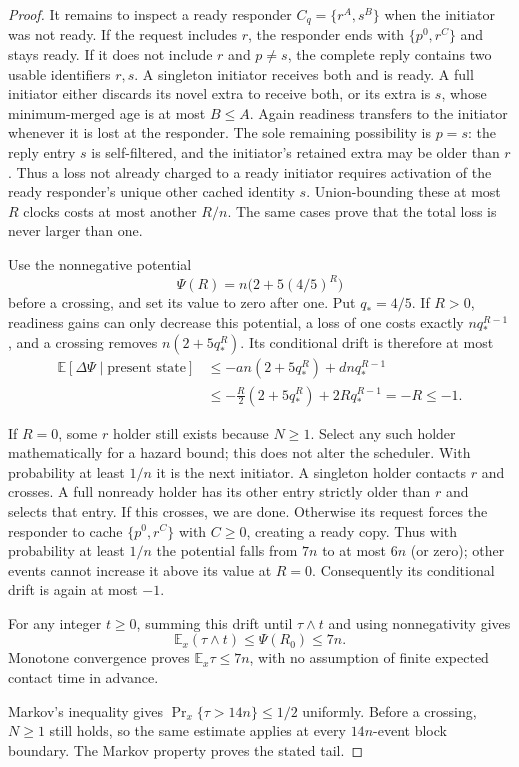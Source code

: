 \begin{proof}
It remains to inspect a ready responder
$C_q=\{r^A,s^B\}$ when the initiator was not ready.
If the request includes $r$, the responder ends
with $\{p^0,r^C\}$ and stays ready.
If it does not include $r$ and $p\ne s$, the
complete reply contains two usable identifiers
$r,s$. A singleton initiator receives both and
is ready. A full initiator either discards its
novel extra to receive both, or its extra is
$s$, whose minimum-merged age is at most
$B\le A$. Again readiness transfers to the
initiator whenever it is lost at the responder.
The sole remaining possibility is $p=s$:
the reply entry $s$ is self-filtered, and the
initiator's retained extra may be older than $r$.
Thus a loss not already charged to a ready
initiator requires activation of the ready
responder's unique other cached identity $s$.
Union-bounding these at most $R$ clocks costs
at most another $R/n$. The same cases prove
that the total loss is never larger than one.

Use the nonnegative potential
\[
 \Psi(R)=n\bigl(2+5(4/5)^R\bigr)
\]
before a crossing, and set its value to zero after
one. Put $q_*=4/5$. If $R>0$, readiness gains
can only decrease this potential, a loss of one
costs exactly $nq_*^{R-1}$, and a crossing removes
$n(2+5q_*^R)$. Its conditional drift is therefore
at most
\[
 \begin{split}
 \mathbb E[\Delta\Psi\mid\text{present state}]
 &\le-a n(2+5q_*^R)+d n q_*^{R-1}\\
 &\le-\frac R2(2+5q_*^R)+2R q_*^{R-1}
 =-R\le-1.
 \end{split}
\]

If $R=0$, some $r$ holder still exists because
$N\ge1$. Select any such holder mathematically
for a hazard bound; this does not alter the
scheduler. With probability at least $1/n$ it
is the next initiator. A singleton holder
contacts $r$ and crosses. A full nonready
holder has its other entry strictly older
than $r$ and selects that entry. If this
crosses, we are done. Otherwise its request
forces the responder to cache
$\{p^0,r^C\}$ with $C\ge0$, creating a ready
copy. Thus with probability at least $1/n$
the potential falls from $7n$ to at most
$6n$ (or zero); other events cannot increase
it above its value at $R=0$. Consequently
its conditional drift is again at most $-1$.

For any integer $t\ge0$, summing this drift
until $\tau\wedge t$ and using nonnegativity
gives
\[
 \mathbb E_x(\tau\wedge t)
 \le\Psi(R_0)\le7n.
\]
Monotone convergence proves
$\mathbb E_x\tau\le7n$, with no assumption
of finite expected contact time in advance.

Markov's inequality gives
$\Pr_x\{\tau>14n\}\le1/2$ uniformly.
Before a crossing, $N\ge1$ still holds,
so the same estimate applies at every
$14n$-event block boundary.
The Markov property proves the stated tail.
\end{proof}

